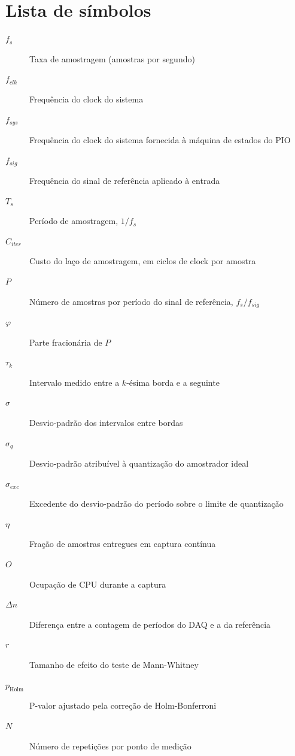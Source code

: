 \chapter*{Lista de símbolos}

\begin{description}
  \item[$f_s$] \quad Taxa de amostragem (amostras por segundo)
  \item[$f_{clk}$] \quad Frequência do clock do sistema
  \item[$f_{sys}$] \quad Frequência do clock do sistema fornecida à máquina de estados do PIO
  \item[$f_{sig}$] \quad Frequência do sinal de referência aplicado à entrada
  \item[$T_s$] \quad Período de amostragem, $1/f_s$
  \item[$C_{iter}$] \quad Custo do laço de amostragem, em ciclos de clock por amostra
  \item[$P$] \quad Número de amostras por período do sinal de referência, $f_s/f_{sig}$
  \item[$\varphi$] \quad Parte fracionária de $P$
  \item[$\tau_k$] \quad Intervalo medido entre a $k$-ésima borda e a seguinte
  \item[$\sigma$] \quad Desvio-padrão dos intervalos entre bordas
  \item[$\sigma_q$] \quad Desvio-padrão atribuível à quantização do amostrador ideal
  \item[$\sigma_{exc}$] \quad Excedente do desvio-padrão do período sobre o limite de quantização
  \item[$\eta$] \quad Fração de amostras entregues em captura contínua
  \item[$O$] \quad Ocupação de CPU durante a captura
  \item[$\Delta n$] \quad Diferença entre a contagem de períodos do DAQ e a da referência
  \item[$r$] \quad Tamanho de efeito do teste de Mann-Whitney
  \item[$p_{\mathrm{Holm}}$] \quad P-valor ajustado pela correção de Holm-Bonferroni
  \item[$N$] \quad Número de repetições por ponto de medição
\end{description}
